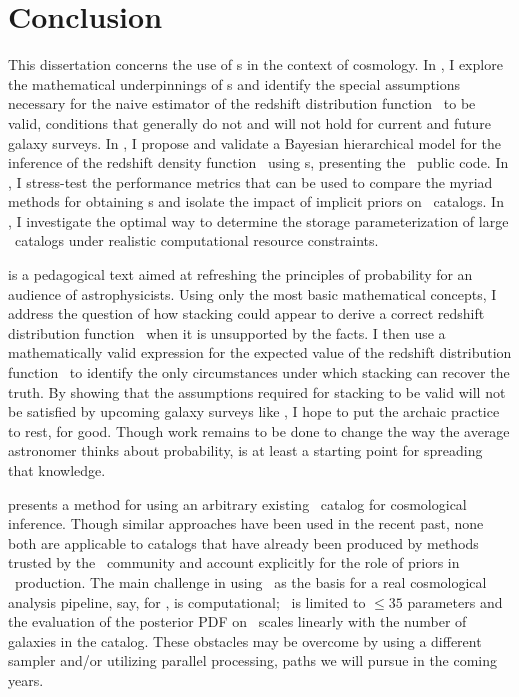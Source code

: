 \chapter*{Conclusion}

This dissertation concerns the use of \pzpdf s in the context of cosmology.
In , I explore the mathematical underpinnings of \pzpdf s and identify the special assumptions necessary for the naive estimator of the redshift distribution function \Nz\ to be valid, conditions that generally do not and will not hold for current and future galaxy surveys.
In , I propose and validate a Bayesian hierarchical model for the inference of the redshift density function \nz\ using \pzpdf s, presenting the \chippr\ public code.
In , I stress-test the performance metrics that can be used to compare the myriad methods for obtaining \pzpdf s and isolate the impact of implicit priors on \pzpdf\ catalogs.
In , I investigate the optimal way to determine the storage parameterization of large \pzpdf\ catalogs under realistic computational resource constraints. 

 is a pedagogical text aimed at refreshing the principles of probability for an audience of astrophysicists.
Using only the most basic mathematical concepts, I address the question of how stacking could appear to derive a correct redshift distribution function \Nz\ when it is unsupported by the facts.
I then use a mathematically valid expression for the expected value of the redshift distribution function \Nz\ to identify the only circumstances under which stacking can recover the truth.
By showing that the assumptions required for stacking to be valid will not be satisfied by upcoming galaxy surveys like \lsst, I hope to put the archaic practice to rest, for good.
Though work remains to be done to change the way the average astronomer thinks about probability,  is at least a starting point for spreading that knowledge.

 presents a method for using an arbitrary existing \pzpdf\ catalog for cosmological inference.
Though similar approaches have been used in the recent past, none both are applicable to catalogs that have already been produced by methods trusted by the \pz\ community and account explicitly for the role of priors in \pzpdf\ production.
The main challenge in using \chippr\ as the basis for a real cosmological analysis pipeline, say, for \lsst, is computational; \emcee\ is limited to $\leq 35$ parameters and the evaluation of the posterior PDF on \nz\ scales linearly with the number of galaxies in the catalog.
These obstacles may be overcome by using a different sampler and/or utilizing parallel processing, paths we will pursue in the coming years.

